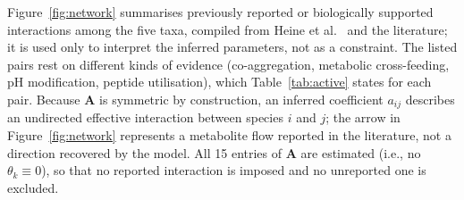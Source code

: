 \documentclass[11pt,a4paper]{article}
\begin{document}
Figure~\ref{fig:network} summarises previously reported or biologically supported interactions among the five taxa, compiled from Heine et al.~\cite{heine2025influence} and the literature; it is used only to interpret the inferred parameters, not as a constraint.
The listed pairs rest on different kinds of evidence (co-aggregation, metabolic cross-feeding, pH modification, peptide utilisation), which Table~\ref{tab:active} states for each pair.
Because $\mathbf{A}$ is symmetric by construction, an inferred coefficient $a_{ij}$ describes an undirected effective interaction between species $i$ and $j$; the arrow in Figure~\ref{fig:network} represents a metabolite flow reported in the literature, not a direction recovered by the model.
All 15 entries of $\mathbf{A}$ are estimated (i.e., no $\theta_k\equiv0$), so that no reported interaction is imposed and no unreported one is excluded.
\end{document}
